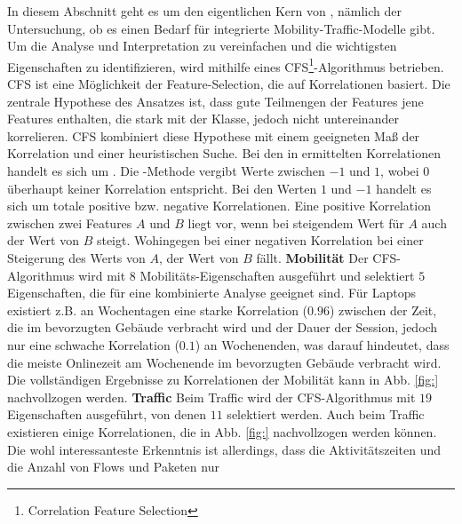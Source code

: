 \documentclass[12pt, a4paper]{article}
\begin{document}
In diesem Abschnitt geht es um den eigentlichen Kern von \cite{Alipour2018}, nämlich der Untersuchung, ob es einen Bedarf
für integrierte Mobility-Traffic-Modelle gibt. Um die Analyse und Interpretation zu vereinfachen und die 
wichtigsten Eigenschaften zu identifizieren, wird mithilfe eines \textsc{CFS}\footnote{Correlation Feature Selection}-Algorithmus
 betrieben. \textsc{CFS} ist eine Möglichkeit der Feature-Selection, die auf Korrelationen
basiert. Die zentrale Hypothese des Ansatzes ist, dass gute Teilmengen der Features jene Features enthalten, die stark
mit der Klasse, jedoch nicht untereinander korrelieren. \textsc{CFS} kombiniert diese Hypothese mit einem geeigneten
Maß der Korrelation und einer heuristischen Suche. \cite{Hall2000}
Bei den in \cite{Alipour2018} ermittelten Korrelationen handelt es sich um .
Die -Methode vergibt Werte zwischen $-1$ und $1$, wobei $0$ überhaupt keiner Korrelation
entspricht. Bei den Werten $1$ und $-1$ handelt es sich um totale positive bzw. negative Korrelationen.
Eine positive Korrelation zwischen zwei Features $A$ und $B$ liegt vor, wenn bei steigendem Wert für $A$
auch der Wert von $B$ steigt. Wohingegen bei einer negativen Korrelation bei einer Steigerung des Werts von $A$, 
der Wert von $B$ fällt. \cite{Nettleton2014}
\newline\newline
\textbf{Mobilität}\newline
Der \textsc{CFS}-Algorithmus wird mit $8$ Mobilitäts-Eigenschaften ausgeführt und selektiert $5$ Eigenschaften, 
die für eine kombinierte Analyse geeignet sind. Für Laptops existiert z.B. an Wochentagen eine starke Korrelation ($0.96$)
zwischen der Zeit, die im bevorzugten Gebäude verbracht wird und der Dauer der Session, jedoch nur eine schwache Korrelation
($0.1$) an Wochenenden, was darauf hindeutet, dass die meiste Onlinezeit am Wochenende im bevorzugten
Gebäude verbracht wird. \cite{Alipour2018} Die vollständigen Ergebnisse zu Korrelationen der Mobilität kann in
Abb. \ref{fig:} nachvollzogen werden.
\newline\newline
\textbf{Traffic}\newline
Beim Traffic wird der \textsc{CFS}-Algorithmus mit $19$ Eigenschaften ausgeführt, von denen $11$
selektiert werden. Auch beim Traffic existieren einige Korrelationen, die in Abb. \ref{fig:} nachvollzogen werden können.
Die wohl interessanteste Erkenntnis ist allerdings, dass die Aktivitätszeiten und die Anzahl von Flows und Paketen nur
\end{document}
